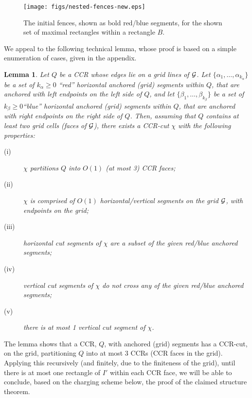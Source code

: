 \documentclass{article}
\newtheorem{lemma}[theorem]{Lemma}
\begin{document}
\begin{figure*}[!ht]
	\centering
	\texttt{[image: figs/nested-fences-new.eps]}
	\caption{The initial fences, shown as bold red/blue segments, for the shown set of maximal rectangles within a rectangle $B$.}   
	\label{fig:nested-fences}
\end{figure*}

We appeal to the following technical lemma, whose proof is
based on a simple enumeration of cases, given in the appendix.

  \begin{lemma}\label{lem:key}
    Let $Q$ be a CCR whose edges
    lie on a grid lines of ${\cal G}$.
    Let $\{\alpha_1,\ldots,\alpha_{k_\alpha}\}$ be a set of $k_\alpha\geq 0$ ``red''
    horizontal anchored (grid) segments within $Q$, that are anchored
    with left endpoints on the left side of $Q$, and let $\{\beta_1,\ldots,\beta_{k_\beta}\}$ be
    a set of $k_\beta\geq 0$``blue'' horizontal anchored (grid) segments within $Q$,
    that are anchored with right endpoints on the right side of $Q$.  Then, assuming that $Q$ contains at
    least two grid cells (faces of ${\cal G}$), there exists a CCR-cut
    $\chi$ with the following properties:
    \begin{description}
    \item[(i)] $\chi$ partitions $Q$ into $O(1)$ (at most 3) CCR faces;
    \item[(ii)] $\chi$ is comprised of $O(1)$ horizontal/vertical
      segments on the grid ${\cal G}$, with endpoints on the grid;
    \item[(iii)] horizontal cut segments of $\chi$ are a subset of the
      given red/blue anchored segments;
    \item[(iv)] vertical cut segments of $\chi$ do not cross any of
      the given red/blue anchored segments;
    \item[(v)] there is at most 1 vertical cut segment of $\chi$.
      \end{description}
  \end{lemma}

The lemma shows that a CCR, $Q$, with anchored (grid) segments has a
CCR-cut, on the grid, partitioning $Q$ into at most 3 CCRs (CCR
faces in the grid). Applying this recursively (and finitely, due to
the finiteness of the grid), until there is at most one rectangle of $I'$
within each CCR face, we will be able to conclude, based on the 
charging scheme below, the proof of the claimed structure theorem.
\end{document}

